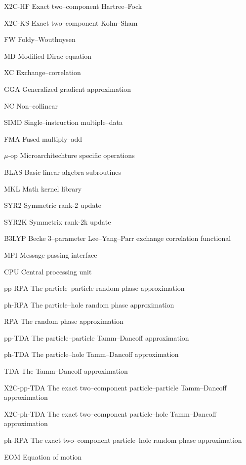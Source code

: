 \begin{glossary}
  \item[X2C-HF]      Exact two--component Hartree--Fock
  \item[X2C-KS]      Exact two--component Kohn--Sham
  \item[FW]          Foldy--Wouthuysen
  \item[MD]          Modified Dirac equation
  \item[XC]          Exchange--correlation
  \item[GGA]         Generalized gradient approximation
  \item[NC]          Non--collinear
  \item[SIMD]        Single--instruction multiple--data
  \item[FMA]         Fused multiply--add
  \item[$\mu$-op]    Microarchitechture specific operations
  \item[BLAS]        Basic linear algebra subroutines
  \item[MKL]         Math kernel library
  \item[SYR2]        Symmetric rank-2 update
  \item[SYR2K]       Symmetrix rank-2k update
  \item[B3LYP]       Becke 3--parameter Lee--Yang--Parr exchange correlation functional
  \item[MPI]         Message passing interface
  \item[CPU]         Central processing unit
  \item[pp-RPA]      The particle--particle random phase approximation
  \item[ph-RPA]      The particle--hole random phase approximation
  \item[RPA]         The random phase approximation
  \item[pp-TDA]      The particle--particle Tamm--Dancoff approximation
  \item[ph-TDA]      The particle--hole Tamm--Dancoff approximation
  \item[TDA]         The Tamm--Dancoff approximation
  \item[X2C-pp-TDA]  The exact two--component particle--particle Tamm--Dancoff approximation
  \item[X2C-ph-TDA]  The exact two--component particle--hole Tamm--Dancoff approximation
  \item[ph-RPA]      The exact two--component particle--hole random phase approximation
  \item[EOM]         Equation of motion

\end{glossary}
